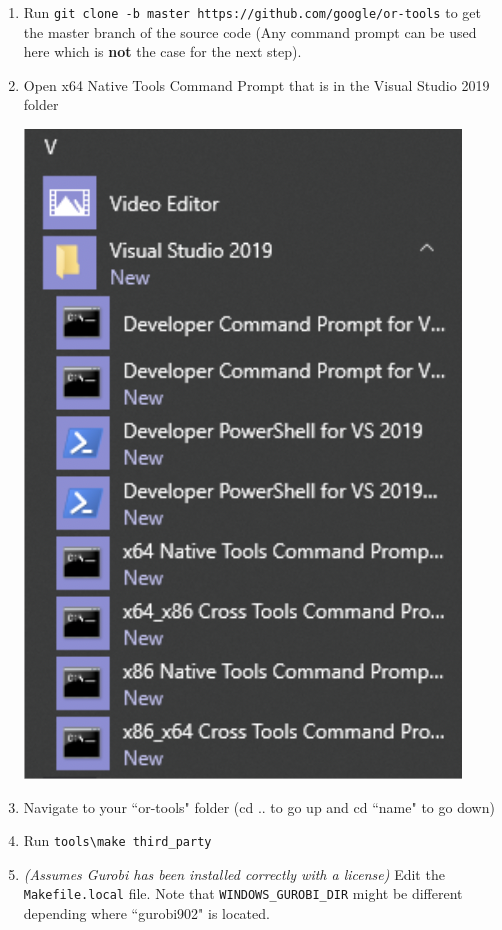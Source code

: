 \documentclass[11 pt]{article}
\newcommand{\code}[1]{\colorbox{gray!10}{\textcolor{black!85}{\texttt{#1}}}}
\begin{document}
\begin{enumerate}
\item Run \code{git clone -b master https://github.com/google/or-tools} to get the master branch of the source code (Any command prompt can be used here which is \textbf{not} the case for the next step).
\item Open x64 Native Tools Command Prompt that is in the Visual Studio 2019 folder
\begin{center}
\includegraphics[scale=0.5]{NativeToolsCommandPrompt.png}
\end{center}
\item Navigate to your ``or-tools" folder (cd .. to go up and cd ``name" to go down)
\item Run \code{tools\textbackslash make third\_party}
\item \textit{(Assumes Gurobi has been installed correctly with a license)} Edit the \texttt{Makefile.local} file. Note that \texttt{WINDOWS\_GUROBI\_DIR} might be different depending where ``gurobi902" is located. 
\begin{center}

\end{center}
\end{enumerate}
\end{document}
